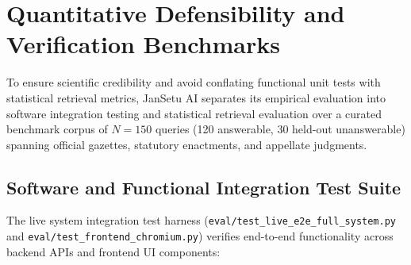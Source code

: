 \documentclass[12pt,a4paper,oneside]{report}
\begin{document}
\section{Quantitative Defensibility and Verification Benchmarks}
To ensure scientific credibility and avoid conflating functional unit tests with statistical retrieval metrics, JanSetu AI separates its empirical evaluation into software integration testing and statistical retrieval evaluation over a curated benchmark corpus of $N = 150$ queries (120 answerable, 30 held-out unanswerable) spanning official gazettes, statutory enactments, and appellate judgments.

\subsection{Software and Functional Integration Test Suite}
The live system integration test harness (\texttt{eval/test\_live\_e2e\_full\_system.py} and \texttt{eval/test\_frontend\_chromium.py}) verifies end-to-end functionality across backend APIs and frontend UI components:
\end{document}

